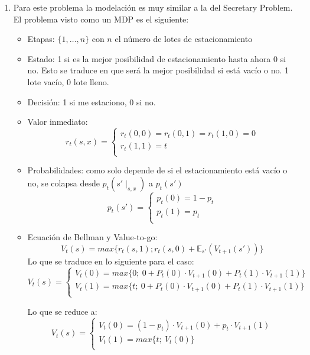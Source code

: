 \documentclass[letterpaper,10pt]{article}
\begin{document}
\begin{enumerate}
    \item Para este problema la modelación es muy similar a la del Secretary Problem. El problema visto como un MDP es el siguiente:
    
    \begin{itemize}
        \item Etapas: $\{1, \dots, n\}$ con $n$ el número de lotes de estacionamiento
        \item Estado: 1 si es la mejor posibilidad de estacionamiento hasta ahora 0 si no. Esto se traduce en que será la mejor posibilidad si está vacío o no. 1 lote vacío, 0 lote lleno.
        \item Decisión: 1 si me estaciono, 0 si no.
        \item Valor inmediato: 
        \[
        r_t(s, x) = 
            \begin{cases}
                r_t(0,0) = r_t(0, 1) = r_t(1, 0) = 0\\
                r_t(1,1) = t\\
            \end{cases}
        \]
        \item Probabilidades: como solo depende de si el estacionamiento está vacío o no, se colapsa desde $p_t(s'\mid_{s,x})$ a $p_t(s')$
        \[
        p_t(s') = 
            \begin{cases}
                p_t(0) = 1 - p_t\\
                p_t(1) = p_t\\
            \end{cases}
        \]
        \item Ecuación de Bellman y Value-to-go:
        $$V_t(s)=max\{r_t(s,1); r_t(s, 0) + \mathds{E}_{s'}(V_{t+1}(s'))\}$$
        Lo que se traduce en lo siguiente para el caso:
        \[
        V_t(s) = 
            \begin{cases}
                V_t(0) = max\{0;\ 0 + P_t(0) \cdot V_{t+1}(0) + P_t(1) \cdot V_{t+1}(1)\}\\
                V_t(1) = max\{t;\ 0 + P_t(0) \cdot V_{t+1}(0) + P_t(1) \cdot V_{t+1}(1)\}\\
            \end{cases}
        \]
        
        Lo que se reduce a:
        \[
        V_t(s) = 
            \begin{cases}
                V_t(0) = (1-p_t)\cdot V_{t+1}(0) + p_t \cdot V_{t+1}(1)\\
                V_t(1) = max\{t;\ V_{t}(0)\}\\
            \end{cases}
        \]
        

\end{itemize}
\end{enumerate}
\end{document}
